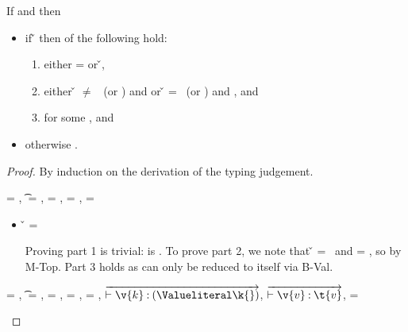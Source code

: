 \begin{lemma} \label{lemma:soundness}
If \judgement{\propenv{}}{\hastype{\e{}}{\t{}}}{\filterset{\thenprop{\prop{}}}{\elseprop{\prop{}}}}{\object{}}
and
\satisfies{\openv{}}{\propenv{}} then
\begin{itemize}
  \item
    if
    \opsem {\openv{}} {\e{}} {\v{}} 
then of the following hold:
\begin{enumerate}
  \item either \object{} = \emptyobject{} or \inopenv {\openv{}} {\object{}} {\v{}},
  \item either \v{} $\not=$ \false\ (or \nil) and {\satisfies{\openv{}}{\thenprop{\prop{}}}} or 
               \v{}       = \false\ (or \nil) and {\satisfies{\openv{}}{\elseprop{\prop{}}}}, and
  \item \judgement{}{\hastype{\v{}}{\t{}}}{\filterset{\thenprop{\propp{}}}{\elseprop{\propp{}}}}{\objectp{}}
        for some \thenprop{\propp{}}, \elseprop{\propp{}} and {\objectp{}}
\end{enumerate}

  \item
otherwise \opsem {\openv{}} {\e{}} {\errorvalv{}}.
\end{itemize}


\begin{proof}
By induction on the derivation of the typing judgement.

\begin{case}[T-True]
\e{} = \true, \t{} = \True, \thenprop{\prop{}} = \topprop{}, \elseprop{\prop{}} = \botprop{}, \object{} = \emptyobject{}

\begin{itemize}
  \item[] 
    \begin{subcase}[B-Val]
      \v{} = \true{}

Proving part 1 is trivial: \object{} is \emptyobject. 
To prove part 2, we note that \v{} = \true\ 
and \thenprop{\prop{}} = \topprop{}, so \satisfies{\openv{}}{\thenprop{\prop{}}} by M-Top.
Part 3 holds as \e{} can only be reduced to itself via B-Val.
\end{subcase}

\end{itemize}

\begin{case}[T-HMap] \e{} = {},
  \t{} = {\HMapc {\mandatory{}}},
  \thenprop{\prop{}} = {\topprop{}},
  \elseprop{\prop{}} = {\botprop{}},
  \object{} = {\emptyobject{}},
  $\overrightarrow{\judgementtwo {} {\hastype{\v{k}}{\Value \k{}}}}$,
  $\overrightarrow{\judgementtwo {} {\hastype{\v{v}}{\t{v}}}}$,
  \mandatory{} = 


\end{case}
\end{case}
\end{proof}
\end{lemma}
